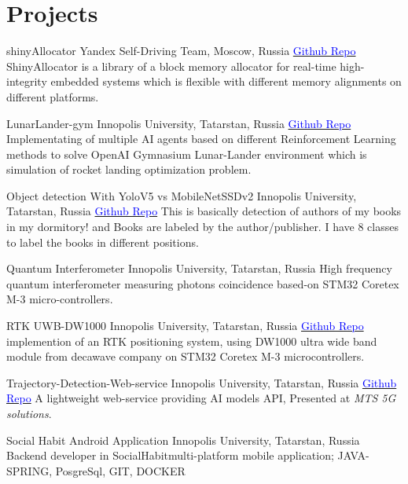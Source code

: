 \section{Projects}

    {shinyAllocator}
    {Yandex Self-Driving Team, Moscow, Russia}{}{}
    {\href{https://github.com/Ehsan2754/ShinyAllocator}{\textcolor{blue}{Github Repo}}  
    ShinyAllocator is a library of a block memory allocator for real-time high-integrity embedded systems which is flexible with different memory alignments on different platforms.  }
    
    {LunarLander-gym}
    {Innopolis University, Tatarstan, Russia}{}{}
    {\href{https://github.com/Ehsan2754/lunarlander_gym}{\textcolor{blue}{Github Repo}}  
    Implementating of multiple AI agents based on different Reinforcement Learning methods to solve OpenAI Gymnasium Lunar-Lander environment which is simulation of rocket landing optimization problem.  }
    
    {Object detection With YoloV5 vs MobileNetSSDv2}
    {Innopolis University, Tatarstan, Russia}{}{}
    {\href{https://github.com/Ehsan2754/ObjectDetection}{\textcolor{blue}{Github Repo}}  
   This is basically detection of authors of my books in my dormitory! and Books are labeled by the author/publisher. I have 8 classes to label the books in different positions.}
    

    {Quantum Interferometer}
    {Innopolis University, Tatarstan, Russia}{}{}
    {High frequency quantum interferometer measuring photons coincidence based-on STM32 Coretex M-3 micro-controllers.}
    
    {RTK UWB-DW1000}
    {Innopolis University, Tatarstan, Russia}{}{}
    {\href{https://github.com/Ehsan2754/RTK-DW1000/tree/main/Client}{\textcolor{blue}{Github Repo}}  implemention of an RTK positioning system, using DW1000 ultra wide band module from decawave company on STM32 Coretex M-3 microcontrollers.}

    {Trajectory-Detection-Web-service }
    {Innopolis University, Tatarstan, Russia}{}{}
    {\href{https://github.com/Ahuratus/Trajectory-Detection-Web-services/tree/main/web}{\textcolor{blue}{Github Repo}} A lightweight web-service providing AI models API, Presented  at \textit{MTS 5G solutions}. }

    {Social Habit Android Application}
    {Innopolis University, Tatarstan, Russia}{}{}
    {Backend developer in SocialHabit\texttrademark multi-platform mobile application; JAVA-SPRING, PosgreSql, GIT, DOCKER}
    

